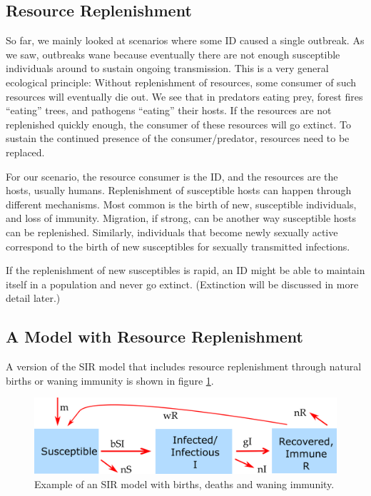 \documentclass[]{article}
\theoremstyle{definition}
\theoremstyle{definition}
\theoremstyle{definition}
\theoremstyle{remark}
\begin{document}
\subsection{Resource Replenishment}\label{resource-replenishment}

So far, we mainly looked at scenarios where some ID caused a single
outbreak. As we saw, outbreaks wane because eventually there are not
enough susceptible individuals around to sustain ongoing transmission.
This is a very general ecological principle: Without replenishment of
resources, some consumer of such resources will eventually die out. We
see that in predators eating prey, forest fires ``eating'' trees, and
pathogens ``eating'' their hosts. If the resources are not replenished
quickly enough, the consumer of these resources will go extinct. To
sustain the continued presence of the consumer/predator, resources need
to be replaced.

For our scenario, the resource consumer is the ID, and the resources are
the hosts, usually humans. Replenishment of susceptible hosts can happen
through different mechanisms. Most common is the birth of new,
susceptible individuals, and loss of immunity. Migration, if strong, can
be another way susceptible hosts can be replenished. Similarly,
individuals that become newly sexually active correspond to the birth of
new susceptibles for sexually transmitted infections.

If the replenishment of new susceptibles is rapid, an ID might be able
to maintain itself in a population and never go extinct. (Extinction
will be discussed in more detail later.)

\subsection{A Model with Resource
Replenishment}\label{a-model-with-resource-replenishment}

A version of the SIR model that includes resource replenishment through
natural births or waning immunity is shown in figure
\ref{fig:birthdeathdmodel}.

\begin{figure}
\centering
\includegraphics{./images/R0modelfigure.png}
\caption{\label{fig:birthdeathdmodel}Example of an SIR model with births,
deaths and waning immunity.}
\end{figure}
\end{document}
